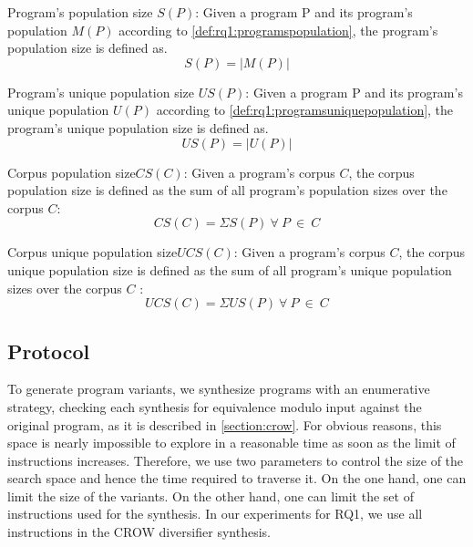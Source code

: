 \begin{metric}{Program's population size $S(P)$:}\label{metric:rq1:PS}
    \normalfont 
    Given a program P and its program's population $M(P)$ according to \autoref{def:rq1:programspopulation}, the program's population size is defined as.\\
    $$
        S(P)=|M(P)|
    $$
\end{metric}


\begin{metric}{Program's unique population size $US(P)$:}\label{metric:rq1:UP}
    \normalfont 
    Given a program P and its program's unique population $U(P)$ according to \autoref{def:rq1:programsuniquepopulation}, the program's unique population size is defined as.\\
    $$
        US(P)=|U(P)|
    $$
\end{metric}

\newcommand{\corpuspopulationsizename}{Corpus population size\xspace}
\newcommand{\corpusuniquepopulationsizename}{Corpus unique population size\xspace}

\begin{metric}{\corpuspopulationsizename$CS(C)$:}\label{metric:rq1:corpus_pop}
    \normalfont 
    Given a program's corpus $C$, the corpus population size is defined as the sum of all program's population sizes over the corpus $C$:\\
    $$
        CS(C)=\Sigma{S(P)}\ \forall\ P\ \in\ C
    $$
\end{metric}

\begin{metric}{\corpusuniquepopulationsizename$UCS(C)$:}\label{metric:rq1:corpus_pop_unique}
    \normalfont 
    Given a program's corpus $C$, the corpus unique population size is defined as the sum of all program's unique population sizes over the corpus $C$ :\\
    $$
    UCS(C)=\Sigma{US(P)}\ \forall\ P\ \in\ C
    $$
\end{metric}


\subsection*{Protocol}
To generate program variants, we synthesize programs with an enumerative strategy, checking each synthesis for equivalence modulo input \cite{Li2018} against the original program, as it is described in \autoref{section:crow}. For obvious reasons, this space is nearly impossible to explore in a reasonable time as soon as the limit of instructions increases.
Therefore, we use two parameters to control the size of the search space and hence the time required to traverse it.
On the one hand, one can limit the size of the variants. On the other hand, one can limit the set of instructions used for the synthesis. In our experiments for RQ1, we use all instructions in the CROW diversifier synthesis.


